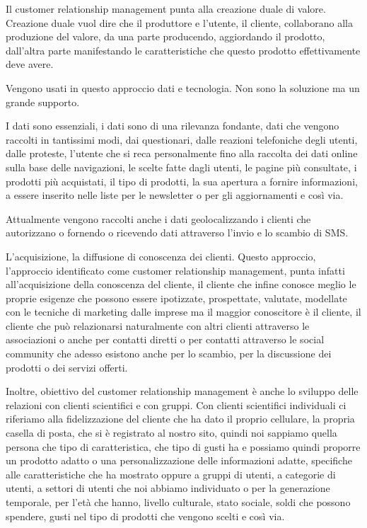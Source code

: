 Il customer relationship management punta alla creazione duale di valore.
Creazione duale vuol dire che il produttore e l'utente, il cliente, collaborano alla produzione del valore, da una parte producendo, aggiordando il prodotto, dall'altra parte manifestando le caratteristiche che questo prodotto effettivamente deve avere.

Vengono usati in questo approccio dati e tecnologia.
Non sono la soluzione ma un grande supporto.

I dati sono essenziali, i dati sono di una rilevanza fondante, dati che vengono raccolti in tantissimi modi, dai questionari, dalle reazioni telefoniche degli utenti, dalle proteste, l'utente che si reca personalmente fino alla raccolta dei dati online sulla base delle navigazioni, le scelte fatte dagli utenti, le pagine più consultate, i prodotti più acquistati, il tipo di prodotti, la sua apertura a fornire informazioni, a essere inserito nelle liste per le newsletter o per gli aggiornamenti e così via.

Attualmente vengono raccolti anche i dati geolocalizzando i clienti che autorizzano o fornendo o ricevendo dati attraverso l'invio e lo scambio di SMS.

L'acquisizione, la diffusione di conoscenza dei clienti.
Questo approccio, l'approccio identificato come customer relationship management, punta infatti all'acquisizione della conoscenza del cliente, il cliente che infine conosce meglio le proprie esigenze che possono essere ipotizzate, prospettate, valutate, modellate con le tecniche di marketing dalle imprese ma il maggior conoscitore è il cliente, il cliente che può relazionarsi naturalmente con altri clienti attraverso le associazioni o anche per contatti diretti o per contatti attraverso le social community che adesso esistono anche per lo scambio, per la discussione dei prodotti o dei servizi offerti.

Inoltre, obiettivo del customer relationship management è anche lo sviluppo delle relazioni con clienti scientifici e con gruppi.
Con clienti scientifici individuali ci riferiamo alla fidelizzazione del cliente che ha dato il proprio cellulare, la propria casella di posta, che si è registrato al nostro sito, quindi noi sappiamo quella persona che tipo di caratteristica, che tipo di gusti ha e possiamo quindi proporre un prodotto adatto o una personalizzazione delle informazioni adatte, specifiche alle caratteristiche che ha mostrato oppure a gruppi di utenti, a categorie di utenti, a settori di utenti che noi abbiamo individuato o per la generazione temporale, per l'età che hanno, livello culturale, stato sociale, soldi che possono spendere, gusti nel tipo di prodotti che vengono scelti e così via.

